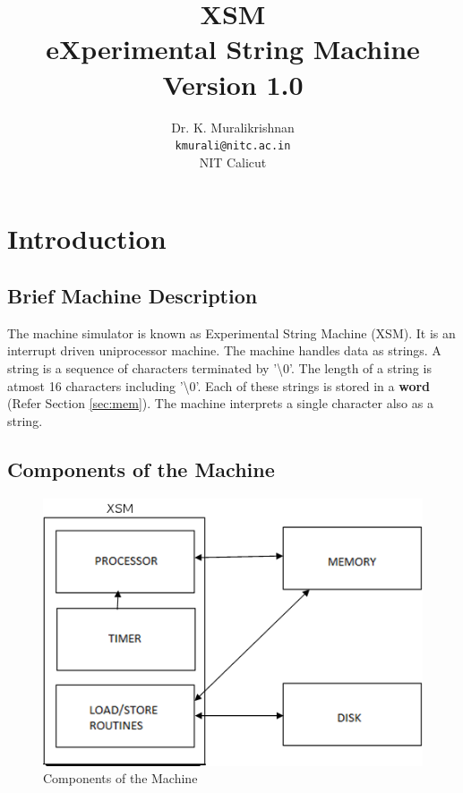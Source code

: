 \documentclass[11pt]{article}
\title{XSM \\ eXperimental String Machine \\
Version 1.0}
\author{Dr. K. Muralikrishnan  \\ \texttt{kmurali@nitc.ac.in} \\ {NIT Calicut} }
\begin{document}
\maketitle
\pagebreak

\thispagestyle{plain}

\tableofcontents
\pagebreak


\section{Introduction}

\subsection{Brief Machine Description}
The machine simulator is known as Experimental String Machine (XSM). It is an interrupt driven uniprocessor machine. The machine handles data as strings. A string is a sequence of characters terminated by '\textbackslash 0'. The length of a string is atmost 16 characters including '\textbackslash 0'. Each of these strings is stored in a \textbf{word}  (Refer Section \ref{sec:mem}). The machine interprets a single character also as a string.

\subsection{Components of the Machine}

\begin{figure}[hbtp]
\begin{center}
\includegraphics[scale=0.5]{block.png}
\end{center}
\caption{Components of the Machine}
\end{figure}
\end{document}
